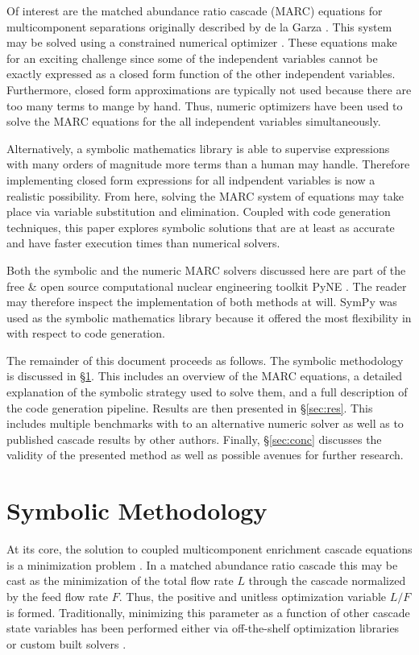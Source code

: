 \documentclass[preprint,12pt]{elsarticle}
\begin{document}
Of interest are the matched abundance ratio cascade (MARC) equations for 
multicomponent separations originally described by de la Garza \cite{DelaGarza1969}.
This system may be solved using a constrained numerical optimizer 
\cite{doi:10.1080/01496391003793884,pyne:enrichment}.  These equations make for an
exciting challenge since some of the independent variables cannot be exactly
expressed as a closed form function of the other independent variables. 
Furthermore, closed form approximations are typically not used because 
there are too many terms to mange by hand.  Thus, numeric optimizers have been used 
to solve the MARC equations for the all independent variables simultaneously.

Alternatively, a symbolic mathematics library is able to supervise expressions 
with many orders of magnitude more terms than a human may handle.  Therefore
implementing closed form expressions for all indpendent variables is now a realistic 
possibility.  From here, solving the MARC system of equations may take place via
variable substitution and elimination.
Coupled with code generation techniques, this paper explores symbolic solutions 
that are at least as accurate and have faster execution times than numerical solvers.

Both the symbolic and the numeric MARC solvers discussed here are part of the free 
\& open source computational nuclear engineering toolkit PyNE \cite{PyNE2012}.  
The reader may therefore inspect the implementation of both methods at will.
SymPy was used as the symbolic mathematics library because 
it offered the most flexibility in with respect to code generation.

The remainder of this document proceeds as follows.  The symbolic methodology 
is discussed in \S\ref{sec:meth}.  This includes an overview of the
MARC equations, a detailed explanation of the symbolic strategy used to solve 
them, and a full description of the code generation pipeline.
Results are then presented in \S\ref{sec:res}.  This includes multiple benchmarks
with to an alternative numeric solver as well as to published cascade results by other 
authors.  Finally, \S\ref{sec:conc} discusses the validity of the presented method
as well as possible avenues for further research.

\section{Symbolic Methodology}
\label{sec:meth}
At its core, the solution to coupled multicomponent enrichment cascade equations is
a minimization problem \cite{Wood1999}.  In a matched abundance ratio 
\cite{DelaGarza1969} cascade this may be cast as the minimization of 
the total flow rate $L$ through the cascade normalized by the feed flow rate $F$.  
Thus, the positive and unitless optimization variable $L/F$ is formed.  Traditionally, 
minimizing this parameter as a function of other cascade state variables has been 
performed either via off-the-shelf optimization libraries 
\cite{doi:10.1080/01496391003793884} or custom built solvers \cite{PyNE2012}.
\end{document}
